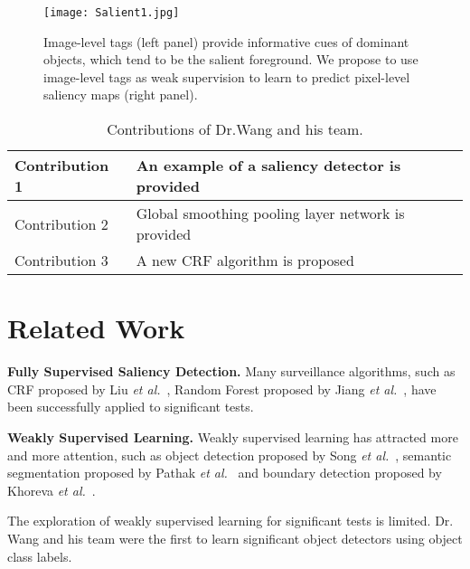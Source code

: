 \documentclass[10pt,twocolumn,letterpaper]{article}
\begin{document}
     \begin{figure}[htbp]
            \centering
            \texttt{[image: Salient1.jpg]}
            \caption{Image-level tags (left panel) provide informative cues of dominant objects, which tend to be the salient foreground. We propose to use image-level tags as weak supervision to learn to predict pixel-level saliency maps (right panel).}
            \label{fig1}
\end{figure}
\begin{table}[hpbt]
            \centering
            \begin{tabular}{|l|l|}
            \hline
            Contribution 1 & An example of a saliency detector is provided \\
            \hline
            Contribution 2 & Global smoothing pooling layer network is provided \\
            \hline
            Contribution 3 & A new CRF algorithm is proposed \\
            \hline
            \end{tabular}
            \caption{Contributions of Dr.Wang and his team.}
            \label{Table1}
        \end{table}
    \section{Related Work}
    \textbf{Fully Supervised Saliency Detection.} Many surveillance algorithms, such as CRF proposed by Liu \emph{et al.}~\cite{[32]}, Random Forest proposed by Jiang \emph{et al.}~\cite{[17]}, have been successfully applied to significant tests.
    \par
    \textbf{Weakly Supervised Learning.} Weakly supervised learning has attracted more and more attention, such as object detection proposed by Song \emph{et al.}~\cite{[44]}, semantic segmentation proposed by Pathak \emph{et al.}~\cite{[37]} and boundary detection proposed by Khoreva \emph{et al.}~\cite{[18]}.
    \par
    The exploration of weakly supervised learning for significant tests is limited. Dr. Wang and his team were the first to learn significant object detectors using object class labels.
{\small


}
\end{document}
